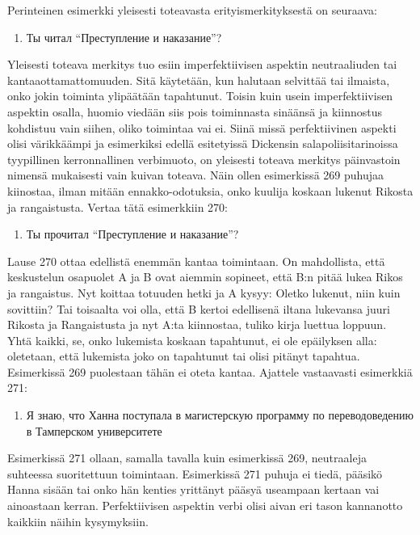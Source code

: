 \documentclass[]{scrreprt}
\providecommand{\tightlist}{%
  \setlength{\itemsep}{0pt}\setlength{\parskip}{0pt}}
\begin{document}
Perinteinen esimerkki yleisesti toteavasta erityismerkityksestä on
seuraava:

\begin{enumerate}
\def\labelenumi{(\arabic{enumi})}
\setcounter{enumi}{268}
\tightlist
\item
  Ты читал ``Преступление и наказание''?
\end{enumerate}

Yleisesti toteava merkitys tuo esiin imperfektiivisen aspektin
neutraaliuden tai kantaaottamattomuuden. Sitä käytetään, kun halutaan
selvittää tai ilmaista, onko jokin toiminta ylipäätään tapahtunut.
Toisin kuin usein imperfektiivisen aspektin osalla, huomio viedään siis
pois toiminnasta sinäänsä ja kiinnostus kohdistuu vain siihen, oliko
toimintaa vai ei. Siinä missä perfektiivinen aspekti olisi värikkäämpi
ja esimerkiksi edellä esitetyissä Dickensin salapoliisitarinoissa
tyypillinen kerronnallinen verbimuoto, on yleisesti toteava merkitys
päinvastoin nimensä mukaisesti vain kuivan toteava. Näin ollen
esimerkissä 269 puhujaa kiinostaa, ilman mitään ennakko-odotuksia, onko
kuulija koskaan lukenut Rikosta ja rangaistusta. Vertaa tätä esimerkkiin
270:

\begin{enumerate}
\def\labelenumi{(\arabic{enumi})}
\setcounter{enumi}{269}
\tightlist
\item
  Ты прочитал ``Преступление и наказание''?
\end{enumerate}

Lause 270 ottaa edellistä enemmän kantaa toimintaan. On mahdollista,
että keskustelun osapuolet A ja B ovat aiemmin sopineet, että B:n pitää
lukea Rikos ja rangaistus. Nyt koittaa totuuden hetki ja A kysyy: Oletko
lukenut, niin kuin sovittiin? Tai toisaalta voi olla, että B kertoi
edellisenä iltana lukevansa juuri Rikosta ja Rangaistusta ja nyt A:ta
kiinnostaa, tuliko kirja luettua loppuun. Yhtä kaikki, se, onko
lukemista koskaan tapahtunut, ei ole epäilyksen alla: oletetaan, että
lukemista joko on tapahtunut tai olisi pitänyt tapahtua. Esimerkissä 269
puolestaan tähän ei oteta kantaa. Ajattele vastaavasti esimerkkiä 271:

\begin{enumerate}
\def\labelenumi{(\arabic{enumi})}
\setcounter{enumi}{270}
\tightlist
\item
  Я знаю, что Ханна поступала в магистерскую программу по
  переводоведению в Тамперском университете
\end{enumerate}

Esimerkissä 271 ollaan, samalla tavalla kuin esimerkissä 269,
neutraaleja suhteessa suoritettuun toimintaan. Esimerkissä 271 puhuja ei
tiedä, pääsikö Hanna sisään tai onko hän kenties yrittänyt pääsyä
useampaan kertaan vai ainoastaan kerran. Perfektiivisen aspektin verbi
olisi aivan eri tason kannanotto kaikkiin näihin kysymyksiin.
\end{document}

